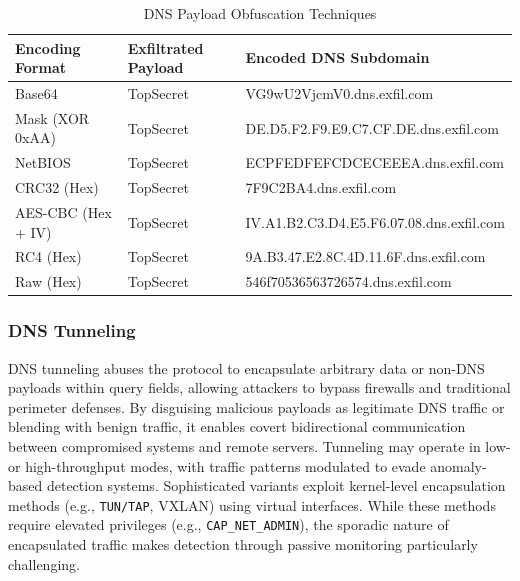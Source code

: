 \documentclass [11pt, proquest] {uwthesis}[2020/02/24]
\begin{document}
\begin{table}[H]
\centering
\begin{tabular}{|l|l|l|}
\hline
\textbf{Encoding Format} & \textbf{Exfiltrated Payload} & \textbf{Encoded DNS Subdomain} \\
\hline
Base64 & TopSecret & VG9wU2VjcmV0.dns.exfil.com \\
\hline
Mask (XOR 0xAA) & TopSecret & DE.D5.F2.F9.E9.C7.CF.DE.dns.exfil.com \\
\hline
NetBIOS & TopSecret & ECPFEDFEFCDCECEEEA.dns.exfil.com \\
\hline
CRC32 (Hex) & TopSecret & 7F9C2BA4.dns.exfil.com \\
\hline
AES-CBC (Hex + IV) & TopSecret & IV.A1.B2.C3.D4.E5.F6.07.08.dns.exfil.com \\
\hline
RC4 (Hex) & TopSecret & 9A.B3.47.E2.8C.4D.11.6F.dns.exfil.com
\\
\hline
Raw (Hex) & TopSecret & 546f70536563726574.dns.exfil.com
\\
\hline
\end{tabular}
\caption{DNS Payload Obfuscation Techniques}
\label{dns_payload_obfuscation}
\end{table}

\subsubsection{DNS Tunneling}
DNS tunneling abuses the protocol to encapsulate arbitrary data or non-DNS payloads within query fields, allowing attackers to bypass firewalls and traditional perimeter defenses. By disguising malicious payloads as legitimate DNS traffic or blending with benign traffic, it enables covert bidirectional communication between compromised systems and remote servers. Tunneling may operate in low- or high-throughput modes, with traffic patterns modulated to evade anomaly-based detection systems.
Sophisticated variants exploit kernel-level encapsulation methods (e.g., \texttt{TUN/TAP}, VXLAN) using virtual interfaces. While these methods require elevated privileges (e.g., \texttt{CAP\_NET\_ADMIN}), the sporadic nature of encapsulated traffic makes detection through passive monitoring particularly challenging.
\end{document}
